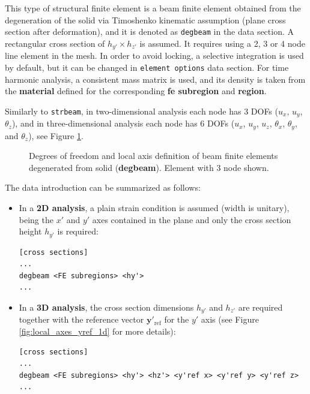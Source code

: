 \documentclass[a4paper,fleqn]{book}
\begin{document}
This type of structural finite element is a beam finite element obtained from the degeneration of the solid via Timoshenko kinematic assumption (plane cross section after deformation), and it is denoted as \texttt{degbeam} in the data section. A rectangular cross section of $h_{y'} \times h_{z'}$ is assumed. It requires using a 2, 3 or 4 node line element in the mesh. In order to avoid locking, a selective integration is used by default, but it can be changed in \texttt{element options} data section. For time harmonic analysis,  a consistent mass matrix is used, and its density is taken from the \textbf{material} defined for the corresponding \textbf{fe subregion} and \textbf{region}.

Similarly to \texttt{strbeam}, in two-dimensional analysis each node has 3 DOFs ($u_x$, $u_y$, $\theta_z$), and in three-dimensional analysis each node has 6 DOFs ($u_x$, $u_y$, $u_z$, $\theta_x$, $\theta_y$, and $\theta_z$), see Figure \ref{fig:degbeam}.

\begin{figure}[h]

\caption{Degrees of freedom and local axis definition of beam finite elements degenerated from solid (\textbf{degbeam}). Element with 3 node shown.}
\label{fig:degbeam}
\end{figure}

The data introduction can be summarized as follows:
\begin{itemize}
  \item In a \textbf{2D analysis}, a plain strain condition is assumed (width is unitary), being the $x'$ and $y'$ axes contained in the plane and only the cross section height $h_{y'}$ is required:
\begin{Verbatim}[frame=single, fontsize=\small, label={format of section [cross sections] for degbeam elements}]
[cross sections]
...
degbeam <FE subregions> <hy'>
...
\end{Verbatim}
  \item  In a \textbf{3D analysis}, the cross section dimensions $h_{y'}$ and $h_{z'}$ are required together with the reference vector $\mathbf{y}'_\mathrm{ref}$ for the $y'$ axis (see Figure \ref{fig:local_axes_yref_1d} for more details):
\begin{Verbatim}[frame=single, fontsize=\small, label={format of section [cross sections] for degbeam elements}]
[cross sections]
...
degbeam <FE subregions> <hy'> <hz'> <y'ref x> <y'ref y> <y'ref z>
...
\end{Verbatim}
\end{itemize}
\end{document}

